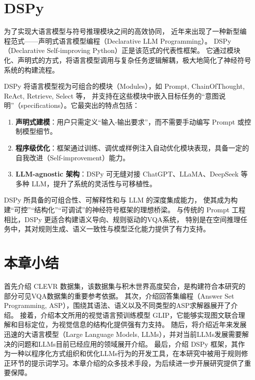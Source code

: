\section{DSPy}
为了实现大语言模型与符号推理模块之间的高效协同，
近年来出现了一种新型编程范式——声明式语言模型编程（Declarative LLM Programming）。
DSPy（Declarative Self-improving Python）正是该范式的代表性框架。
它通过模块化、声明式的方式，将语言模型调用与复杂任务逻辑解耦，极大地简化了神经符号系统的构建流程。

DSPy 将语言模型视为可组合的模块（Modules），如 Prompt, ChainOfThought, ReAct, Retrieve, Select 等，
并支持在这些模块中嵌入目标任务的“意图说明”（specifications）。它最突出的特点包括：
\begin{enumerate}[nosep]
\item \textbf{声明式建模}：用户只需定义“输入-输出要求”，而不需要手动编写 Prompt 或控制模型细节。
\item \textbf{程序级优化}：框架通过训练、调优或样例注入自动优化模块表现，具备一定的自我改进（Self-improvement）能力。
\item \textbf{LLM-agnostic 架构}：DSPy 可无缝对接 ChatGPT、LLaMA、DeepSeek 等多种 LLM，提升了系统的灵活性与可移植性。
\end{enumerate}

DSPy 所具备的可组合性、可解释性和与 LLM 的深度集成能力，
使其成为构建“可控”“结构化”“可调试”的神经符号框架的理想桥梁。
与传统的 Prompt 工程相比，DSPy 更适合构建语义导向、规则驱动的VQA系统，
特别是在空间推理任务中，其对规则生成、语义一致性与模型泛化能力提供了有力支持。
\section{本章小结}
首先介绍 CLEVR 数据集，该数据集与积木世界高度契合，是构建符合本研究的部分可见VQA数据集的重要参考依据。
其次，介绍回答集编程（Answer Set Programming, ASP），围绕其语法、语义以及不同类型的ASP求解器展开了介绍。
接着，介绍本文所用的视觉语言预训练模型 GLIP，它能够实现图文联合理解和目标定位，为视觉信息的结构化提供强有力支持。
随后，将介绍近年来发展迅速的大语言模型（Large Language Models, LLMs），并对当前LLMs发展需要解决的问题和LLMs目前已经应用的领域展开介绍。
最后，介绍 DSPy 框架，其作为一种以程序化方式组织和优化LLMs行为的开发工具，在本研究中被用于规则修正环节的提示词学习。本章介绍的众多技术手段，为后续进一步开展研究提供了重要保障。